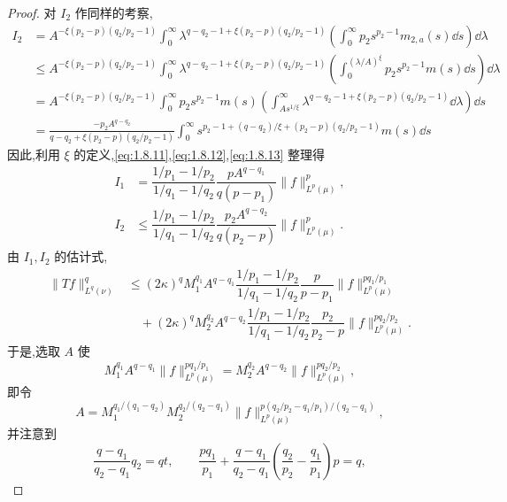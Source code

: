 \begin{proof}
对 $I_{2}$ 作同样的考察,
\begin{align*}
I_{2}&= A^{-\xi(p_{2}-p)(q_{2}/p_{2}-1)}\displaystyle\int_{0}^{\infty}\lambda^{q-q_{2}-1+\xi(p_{2}-p)(q_{2}/p_{2}-1)}\left(\int_{0}^{\infty}p_{2}s^{p_{2}-1}m_{2,a}(s)\dd s\right)\dd \lambda  \\
&\leq A^{-\xi(p_{2}-p)(q_{2}/p_{2}-1)}\displaystyle\int_{0}^{\infty}\lambda^{q-q_{2}-1+\xi(p_{2}-p)(q_{2}/p_{2}-1)}\left(\int_{0}^{(\lambda/A)^{\xi}}p_{2}s^{p_{2}-1}m(s)\dd s\right)\dd \lambda \\
&= A^{-\xi(p_{2}-p)(q_{2}/p_{2}-1)}\displaystyle\int_{0}^{\infty}p_{2}s^{p_{2}-1}m(s)\left(\int_{As^{1/\xi}}^{\infty}\lambda^{q-q_{2}-1+\xi(p_{2}-p)(q_{2}/p_{2}-1)}\dd \lambda\right)\dd s \\
&= \frac{-p_{2}A^{q-q_{2}}}{q - q_{2} + \xi(p_{2}-p)(q_{2}/p_{2}-1)}\displaystyle\int_{0}^{\infty}s^{p_{2}-1+(q-q_{2})/\xi+(p_{2}-p)(q_{2}/p_{2}-1)}m(s)\dd s
\end{align*}
因此,利用 $\xi$ 的定义,\eqref{eq:1.8.11},\eqref{eq:1.8.12},\eqref{eq:1.8.13} 整理得
\begin{align*}
I_{1} &= \dfrac{1/p_{1} - 1/p_{2}}{1/q_{1} - 1/q_{2}}\dfrac{pA^{q-q_{1}}}{q(p - p_{1})}\| f \|_{L^{p}(\mu)}^{p}, \\
I_{2} &\leq \dfrac{1/p_{1} - 1/p_{2}}{1/q_{1} - 1/q_{2}}\dfrac{p_{2}A^{q-q_{2}}}{q(p_{2} - p)}\| f \|_{L^{p}(\mu)}^{p}.
\end{align*}
由 $I_{1}, I_{2}$ 的估计式,
\begin{align*}
\| Tf \|_{L^{q}(\nu)}^{q} & \leq (2\kappa)^{q}M_{1}^{q_{1}}A^{q-q_{1}}\dfrac{1/p_{1} - 1/p_{2}}{1/q_{1} - 1/q_{2}}\dfrac{p}{p - p_{1}}\| f \|_{L^{p}(\mu)}^{pq_{1}/p_{1}} \\
& \quad + (2\kappa)^{q}M_{2}^{q_{2}}A^{q-q_{2}}\dfrac{1/p_{1} - 1/p_{2}}{1/q_{1} - 1/q_{2}}\dfrac{p_{2}}{p_{2} - p}\| f \|_{L^{p}(\mu)}^{pq_{2}/p_{2}}.
\end{align*}
于是,选取 $A$ 使
\begin{equation*}
M_{1}^{q_{1}}A^{q-q_{1}}\| f \|_{L^{p}(\mu)}^{pq_{1}/p_{1}} = M_{2}^{q_{2}}A^{q-q_{2}}\| f \|_{L^{p}(\mu)}^{pq_{2}/p_{2}},
\end{equation*}
即令
\begin{equation*}
A = M_{1}^{q_{1}/(q_{1}-q_{2})}M_{2}^{q_{2}/(q_{2}-q_{1})}\| f \|_{L^{p}(\mu)}^{p(q_{2}/p_{2}-q_{1}/p_{1})/(q_{2}-q_{1})},
\end{equation*}
并注意到
\begin{equation*}
\frac{q - q_{1}}{q_{2} - q_{1}}q_{2} = qt, \qquad
\frac{pq_{1}}{p_{1}} + \frac{q - q_{1}}{q_{2} - q_{1}}\left(\frac{q_{2}}{p_{2}} - \frac{q_{1}}{p_{1}}\right)p = q,

\end{equation*}
\end{proof}
